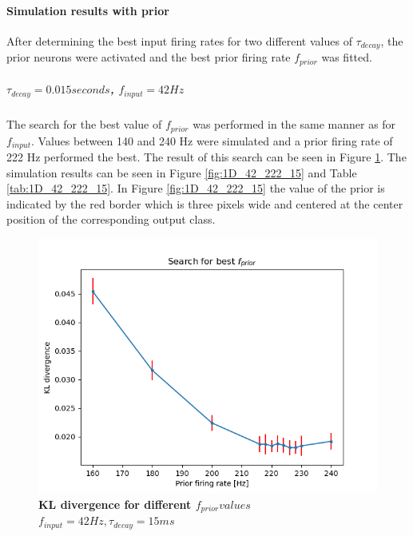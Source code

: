 \paragraph{Simulation results with prior}
After determining the best input firing rates for two different values of $\tau_{decay}$, the prior neurons were activated and the best prior firing rate $f_{prior}$ was fitted.
\subparagraph{$\tau_{decay} = 0.015 seconds$, $f_{input} = 42 Hz$}
The search for the best value of $f_{prior}$ was performed in the same manner as for $f_{input}$. Values between 140 and 240 Hz were simulated and a prior firing rate of 222 Hz performed the best. The result of this search can be seen in Figure \ref{fig:1D_KLD_fInput42_tau15}. The simulation results can be seen in Figure \ref{fig:1D_42_222_15} and Table \ref{tab:1D_42_222_15}. In Figure \ref{fig:1D_42_222_15} the value of the prior is indicated by the red border which is three pixels wide and centered at the center position of the corresponding output class.

\begin{figure}
  \includegraphics[width=\linewidth]{figures/1D/KLDvsfPrior_fInput42tau15.png}
  \caption{\textbf{KL divergence for different $f_{prior} values$} $f_{input} = 42 Hz, \tau_{decay} = 15 ms$}
  \label{fig:1D_KLD_fInput42_tau15}
\end{figure}

